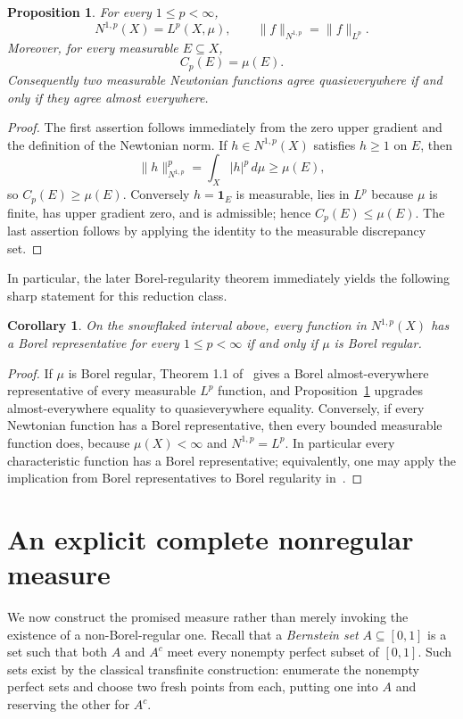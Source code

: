 \documentclass[11pt]{amsart}
\newtheorem{proposition}[theorem]{Proposition}
\newtheorem{corollary}[theorem]{Corollary}
\theoremstyle{definition}
\newcommand{\Cp}{C_p}
\newcommand{\Np}{N^{1,p}}
\begin{document}
\begin{proposition}\label{prop:collapse}
For every $1\le p<\infty$,
\[
 \Np(X)=L^p(X,\mu),\qquad
 \|f\|_{\Np}=\|f\|_{L^p}.
\]
Moreover, for every measurable $E\subseteq X$,
\[
 \Cp(E)=\mu(E).
\]
Consequently two measurable Newtonian functions agree quasieverywhere if and
only if they agree almost everywhere.
\end{proposition}

\begin{proof}
The first assertion follows immediately from the zero upper gradient and the
definition of the Newtonian norm.  If $h\in\Np(X)$ satisfies $h\ge1$ on
$E$, then
\[
 \|h\|_{\Np}^p=\int_X|h|^p\,d\mu\ge\mu(E),
\]
so $\Cp(E)\ge\mu(E)$.  Conversely $h=\mathbf1_E$ is measurable, lies in
$L^p$ because $\mu$ is finite, has upper gradient zero, and is admissible;
hence $\Cp(E)\le\mu(E)$.  The last assertion follows by applying the identity
to the measurable discrepancy set.
\end{proof}

In particular, the later Borel-regularity theorem immediately yields the
following sharp statement for this reduction class.

\begin{corollary}\label{cor:iff}
On the snowflaked interval above, every function in $\Np(X)$ has a Borel
representative for every $1\le p<\infty$ if and only if $\mu$ is Borel
regular.
\end{corollary}

\begin{proof}
If $\mu$ is Borel regular, Theorem 1.1 of~\cite{support} gives a Borel
almost-everywhere representative of every measurable $L^p$ function, and
Proposition~\ref{prop:collapse} upgrades almost-everywhere equality to
quasieverywhere equality.  Conversely, if every Newtonian function has a
Borel representative, then every bounded measurable function does, because
$\mu(X)<\infty$ and $\Np=L^p$.  In particular every characteristic function
has a Borel representative; equivalently, one may apply the implication from
Borel representatives to Borel regularity in~\cite{support}.
\end{proof}

\section{An explicit complete nonregular measure}

We now construct the promised measure rather than merely invoking the
existence of a non-Borel-regular one.  Recall that a \emph{Bernstein set}
$A\subseteq[0,1]$ is a set such that both $A$ and $A^c$ meet every nonempty
perfect subset of $[0,1]$.  Such sets exist by the classical transfinite
construction: enumerate the nonempty perfect sets and choose two fresh
points from each, putting one into $A$ and reserving the other for $A^c$.
\end{document}
